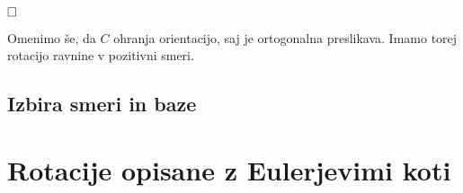 \documentclass[a4paper,12pt]{article}
\def\N{\mathbb{N}} %
\def\qed{$\hfill\Box$}   %
\newtheorem{definicija}{Definicija}
\newtheorem{zgled}{Zgled}
\begin{document}
\qed

Omenimo še, da $C$ ohranja orientacijo, saj je ortogonalna preslikava. Imamo torej rotacijo ravnine v pozitivni smeri.

\subsection{Izbira smeri in baze}

\section{Rotacije opisane z Eulerjevimi koti}







\end{document}
